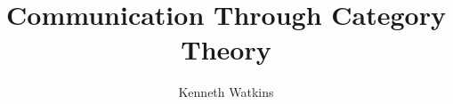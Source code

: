 \documentclass{article}
\title{Communication Through Category Theory}
\author{Kenneth Watkins}
\begin{document}
\maketitle
\tableofcontents

\pagebreak

\pagebreak

\end{document}
